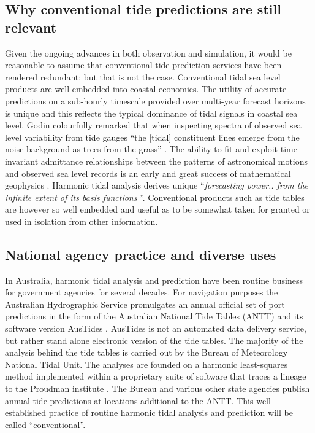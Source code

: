 \subsection{Why conventional tide predictions are still relevant}
Given the ongoing advances in both observation and simulation, it would be reasonable to assume that conventional tide prediction services have been rendered redundant; but that is not the case. 
Conventional tidal sea level products are well embedded into coastal economies.   The utility of accurate predictions on a sub-hourly timescale provided over multi-year forecast horizons is unique and this reflects the typical dominance of tidal signals in coastal sea level.
Godin colourfully remarked that when inspecting spectra of observed sea level variability from tide gauges ``the [tidal] constituent lines emerge from the noise background as trees from the grass'' \cite{godin:1972}.
The ability to fit and exploit time-invariant admittance relationships between the patterns of astronomical motions and observed sea level records is an early and great success of mathematical geophysics \cite{Cartwright:2000tt}.  Harmonic tidal analysis derives unique ``\textit{forecasting power.. from the infinite extent of its basis functions} ''\citep{Flinchem:2000kp}.
Conventional products such as tide tables are however so well embedded and useful as to be somewhat taken for granted or used in isolation from other information. 

\subsection{National agency practice and diverse uses}
In Australia, harmonic tidal analysis and prediction have been routine business for government agencies for several decades.  For navigation purposes the Australian Hydrographic Service promulgates an annual official set of port predictions in the form of the Australian National Tide Tables (ANTT) and its software version AusTides \cite{austides}.  AusTides is not an automated data delivery service, but rather stand alone electronic version of the tide tables.  
The majority of the analysis behind the tide tables is carried out by the Bureau of Meteorology National Tidal Unit.  
The analyses are founded on a harmonic least-squares method implemented within a proprietary suite of software that traces a lineage to the Proudman institute \citep{MHL2156}.    
The Bureau and various other state agencies publish annual tide predictions at locations additional to the ANTT. 
This well established practice of routine harmonic tidal analysis and prediction will be called ``conventional''.


